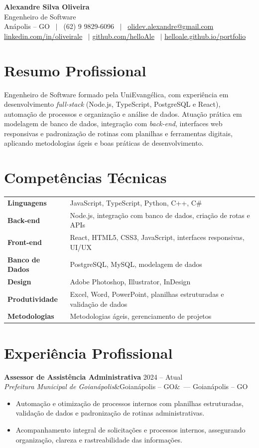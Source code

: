 \documentclass[10.5pt,a4paper]{article}
\newcommand{\entry}[4]{%
  \textbf{#1} \hfill #4\\
  \textit{#2}\ifx&#3&\else\ --- #3\fi\par\vspace{1pt}}
\begin{document}
\begin{center}
  {\Huge\bfseries\color{accent} Alexandre Silva Oliveira}\\[3pt]
  {\large Engenheiro de Software}\\[4pt]
  Anápolis -- GO \ $|$ \ (62) 9 9829-6096 \ $|$ \ \href{mailto:olidev.alexandre@gmail.com}{olidev.alexandre@gmail.com}\\[1pt]
  \href{https://www.linkedin.com/in/oliveirale}{linkedin.com/in/oliveirale} \ $|$
  \href{https://github.com/helloAle}{github.com/helloAle} \ $|$
  \href{https://helloale.github.io/portfolio}{helloale.github.io/portfolio}
\end{center}

\section{Resumo Profissional}
Engenheiro de Software formado pela UniEvangélica, com experiência em desenvolvimento \textit{full-stack} (Node.js, TypeScript, PostgreSQL e React), automação de processos e organização e análise de dados. Atuação prática em modelagem de banco de dados, integração com \textit{back-end}, interfaces web responsivas e padronização de rotinas com planilhas e ferramentas digitais, aplicando metodologias ágeis e boas práticas de desenvolvimento.

\section{Competências Técnicas}
\begin{tabular}{@{}p{3.6cm}p{13cm}@{}}
\textbf{Linguagens} & JavaScript, TypeScript, Python, C++, C\#\\
\textbf{Back-end} & Node.js, integração com banco de dados, criação de rotas e APIs\\
\textbf{Front-end} & React, HTML5, CSS3, JavaScript, interfaces responsivas, UI/UX\\
\textbf{Banco de Dados} & PostgreSQL, MySQL, modelagem de dados\\
\textbf{Design} & Adobe Photoshop, Illustrator, InDesign\\
\textbf{Produtividade} & Excel, Word, PowerPoint, planilhas estruturadas e validação de dados\\
\textbf{Metodologias} & Metodologias ágeis, gerenciamento de projetos\\
\end{tabular}

\section{Experiência Profissional}
\entry{Assessor de Assistência Administrativa}{Prefeitura Municipal de Goianápolis}{Goianápolis -- GO}{2024 -- Atual}
\begin{itemize}
  \item Automação e otimização de processos internos com planilhas estruturadas, validação de dados e padronização de rotinas administrativas.
  \item Acompanhamento integral de solicitações e processos internos, assegurando organização, clareza e rastreabilidade das informações.
\end{itemize}
\end{document}
